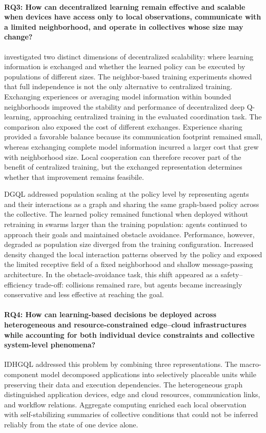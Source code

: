 \paragraph{RQ3: How can decentralized learning remain effective and scalable
when devices have access only to local observations, communicate with a limited
neighborhood, and operate in collectives whose size may change?}
 investigated two distinct dimensions of decentralized scalability:
 where learning information is exchanged and whether the learned policy 
 can be executed by populations of different sizes.
%
The neighbor-based training experiments showed that full independence 
 is not the only alternative to centralized training.
%
Exchanging experiences or averaging model information within bounded neighborhoods 
improved the stability and performance of decentralized deep Q-learning, 
approaching centralized training in the evaluated coordination task.
%
The comparison also exposed the cost of different exchanges. 
%
Experience sharing provided a favorable balance because its communication footprint remained small,
 whereas exchanging complete model information incurred a larger cost that grew with neighborhood size.
% 
Local cooperation can therefore recover part of the benefit of centralized training, 
 but the exchanged representation determines whether that improvement remains feasibile.

DGQL addressed population scaling at the policy level by representing agents 
 and their interactions as a graph and sharing the same graph-based policy across the collective.
%
The learned policy remained functional when deployed without retraining 
 in swarms larger than the training population: 
 agents continued to approach their goals and maintained obstacle avoidance.
%
Performance, however, 
 degraded as population size diverged from the training configuration. 
% 
Increased density changed the local interaction patterns observed by the policy 
 and exposed the limited receptive field of a fixed neighborhood 
 and shallow message-passing architecture. 
% 
In the obstacle-avoidance task, this shift appeared as a safety--efficiency trade-off:
 collisions remained rare, but agents became increasingly conservative and less effective at reaching the goal.

\paragraph{RQ4: How can learning-based decisions be deployed across heterogeneous
and resource-constrained edge--cloud infrastructures while accounting for both
individual device constraints and collective system-level phenomena?}
IDHGQL addressed this problem by combining three representations.
%
The macro-component model decomposed applications into selectively placeable
 units while preserving their data and execution dependencies.
%
The heterogeneous graph distinguished application devices,
 edge and cloud resources, communication links, and workflow relations.
%
Aggregate computing enriched each local observation with self-stabilizing
 summaries of collective conditions that could not be inferred reliably from the
 state of one device alone.

